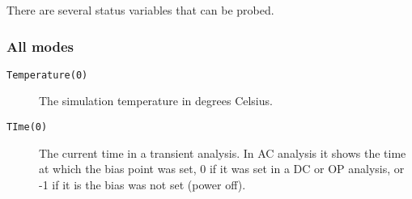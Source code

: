 There are several status variables that can be probed.
\subsubsection{All modes}

\begin{description}

\item[{\tt Temperature(0)}] The simulation temperature in degrees Celsius.

\item[{\tt TIme(0)}] The current time in a transient analysis.  In AC
analysis it shows the time at which the bias point was set, 0 if it was set
in a DC or OP analysis, or -1 if it is the bias was not set (power off).

\end{description}
